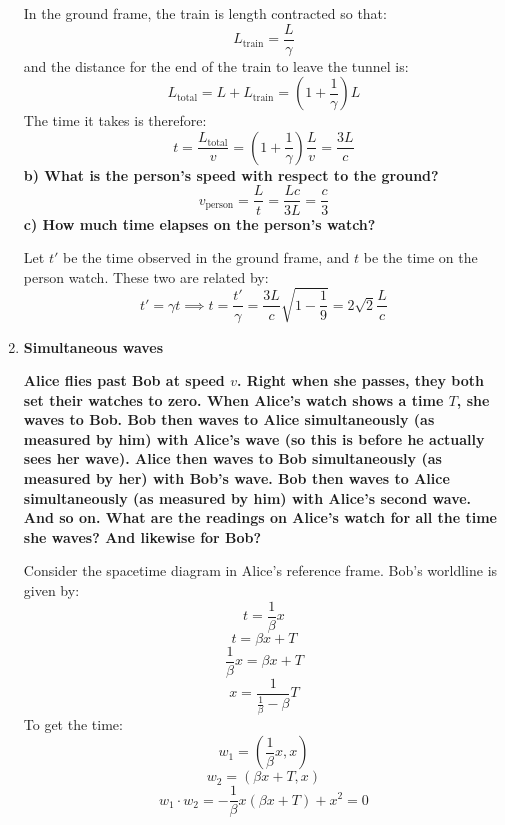 \documentclass[9pt]{report}
\begin{document}
\begin{enumerate}
    In the ground frame, the train is length contracted so that:
    \[
      L_\text{train} = \frac{L}{\gamma}
    \]
    and the distance for the end of the train to leave the tunnel
    is:
    \[
      L_\text{total} = L + L_\text{train} = (1 + \frac{1}{\gamma})L
    \]
    The time it takes is therefore:
    \[
      t = \frac{L_\text{total}}{v} = (1 + \frac{1}{\gamma}) \frac{L}{v} = \frac{3L}{c}
    \]
    \textbf{b) What is the person's speed with respect to the ground?}
    \[
      v_\text{person} = \frac{L}{t} = \frac{Lc}{3L} = \frac{c}{3}
    \]
    \textbf{c) How much time elapses on the person's watch?}

    Let $t'$ be the time observed in the ground frame, and $t$ be the time on
    the person watch. These two are related by:
    \[
      t' = \gamma t \implies t = \frac{t'}{\gamma} = \frac{3L}{c}\sqrt{1-\frac{1}{9}} = 2\sqrt{2}\frac{L}{c}
    \]
  \item \textbf{Simultaneous waves}

  \textbf{Alice flies past Bob at speed $v$. Right when she passes, they both
    set their watches to zero. When Alice's watch shows a time $T$, she waves
    to Bob. Bob then waves to Alice simultaneously (as measured by him) with Alice's
    wave (so this is before he actually sees her wave). Alice then
    waves to Bob simultaneously (as measured by her) with Bob's wave. Bob
    then waves to Alice simultaneously (as measured by him) with Alice's second
    wave. And so on. What are the readings on Alice's watch for all the time she
    waves? And likewise for Bob?}

    Consider the spacetime diagram in Alice's reference frame.
    Bob's worldline is given by:
    \[
      t = \frac{1}{\beta}x
    \]
    \[
      t = \beta x + T
    \]
    \[
      \frac{1}{\beta} x = \beta x + T
    \]
    \[
      x = \frac{1}{\frac{1}{\beta}-\beta} T
    \]
    To get the time:
    \[
      w_1 = (\frac{1}{\beta}x, x)
    \]
    \[
      w_2 = (\beta x+T, x)
    \]
    \[
      w_1 \cdot w_2 = -\frac{1}{\beta}x(\beta x + T) + x^2 = 0
    \]
\end{enumerate}
\end{document}

